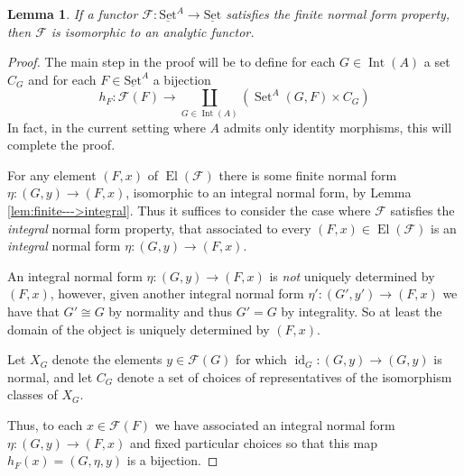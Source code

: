 \documentclass[12pt]{article}
\theoremstyle{plain}
\newtheorem{lemma}[thm]{Lemma}
\theoremstyle{definition}
\newcommand{\scr}[1]{\mathscr{#1}}
\newcommand{\lto}{\longrightarrow}
\newcommand{\set}{\operatorname{\underline{Set}}}
\begin{document}
	\begin{lemma}\label{lem:normal_form_prop--->analytic}
		If a functor $\scr{F}: \set^A \lto \set$ satisfies the finite normal form property, then $\scr{F}$ is isomorphic to an analytic functor.
		\end{lemma}
	\begin{proof}
		The main step in the proof will be to define for each $G \in \operatorname{Int}(A)$ a set $C_G$ and for each $F \in \set^A$ a bijection
		\begin{equation}\label{eq:bijection}
			h_F: \scr{F}(F) \lto \coprod_{G \in \operatorname{Int}(A)}(\operatorname{Set}^A(G, F) \times C_G)
			\end{equation}
		In fact, in the current setting where $A$ admits only identity morphisms, this will complete the proof.
		
		For any element $(F,x)$ of $\operatorname{El}(\scr{F})$ there is some finite normal form $\eta: (G,y) \lto (F,x)$, isomorphic to an integral normal form, by Lemma \ref{lem:finite--->integral}. Thus it suffices to consider the case where $\scr{F}$ satisfies the \emph{integral} normal form property, that associated to every $(F,x) \in \operatorname{El}(\scr{F})$ is an \emph{integral} normal form $\eta: (G, y) \lto (F,x)$.
		
		An integral normal form $\eta: (G,y) \lto (F,x)$ is \emph{not} uniquely determined by $(F,x)$, however, given another integral normal form $\eta': (G',y') \lto (F,x)$ we have that $G' \cong G$ by normality and thus $G' = G$ by integrality. So at least the domain of the object is uniquely determined by $(F,x)$.
		
		Let $X_G$ denote the elements $y \in \scr{F}(G)$ for which $\operatorname{id}_G: (G,y) \lto (G,y)$ is normal, and let $C_G$ denote a set of choices of representatives of the isomorphism classes of $X_G$.
				
		Thus, to each $x \in \scr{F}(F)$ we have associated an integral normal form $\eta: (G, y) \lto (F,x)$ and fixed particular choices so that this map $h_F(x) = (G, \eta, y)$ is a bijection.
		\end{proof}
	
\end{document}
